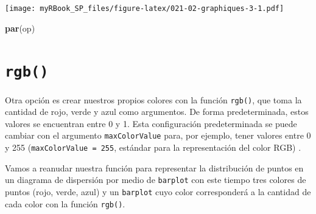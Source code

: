 \documentclass[
]{book}
\newenvironment{Shaded}{\begin{snugshade}}{\end{snugshade}}
\newcommand{\KeywordTok}[1]{\textcolor[rgb]{0.13,0.29,0.53}{\textbf{#1}}}
\newcommand{\NormalTok}[1]{#1}
\begin{document}
\texttt{[image: myRBook\_SP\_files/figure-latex/021-02-graphiques-3-1.pdf]}

\begin{Shaded}
\begin{Highlighting}[]
\KeywordTok{par}\NormalTok{(op)}
\end{Highlighting}
\end{Shaded}

\hypertarget{rgb}{%
\section{\texorpdfstring{\texttt{rgb()}}{rgb()}}\label{rgb}}

Otra opción es crear nuestros propios colores con la función \texttt{rgb()}, que toma la cantidad de rojo, verde y azul como argumentos. De forma predeterminada, estos valores se encuentran entre 0 y 1. Esta configuración predeterminada se puede cambiar con el argumento \texttt{maxColorValue} para, por ejemplo, tener valores entre 0 y 255 (\texttt{maxColorValue\ =\ 255}, estándar para la representación del color RGB) .

Vamos a reanudar nuestra función para representar la distribución de puntos en un diagrama de dispersión por medio de \texttt{barplot} con este tiempo tres colores de puntos (rojo, verde, azul) y un \texttt{barplot} cuyo color corresponderá a la cantidad de cada color con la función \texttt{rgb()}.
\end{document}
